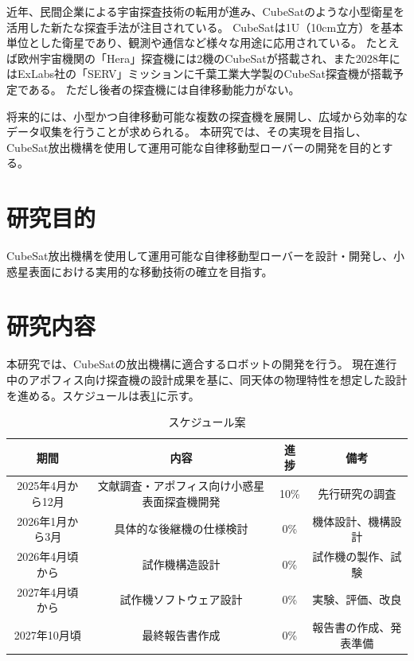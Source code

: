 \documentclass[dvipdfmx,titlepage,a4j]{jsarticle}
\begin{document}
近年、民間企業による宇宙探査技術の転用が進み、CubeSatのような小型衛星を活用した新たな探査手法が注目されている。
CubeSatは1U（10cm立方）を基本単位とした衛星であり、観測や通信など様々な用途に応用されている。
たとえば欧州宇宙機関の「Hera」探査機には2機のCubeSatが搭載され、また2028年にはExLabs社の「SERV」ミッションに千葉工業大学製のCubeSat探査機が搭載予定である。
ただし後者の探査機には自律移動能力がない。

将来的には、小型かつ自律移動可能な複数の探査機を展開し、広域から効率的なデータ収集を行うことが求められる。
本研究では、その実現を目指し、CubeSat放出機構を使用して運用可能な自律移動型ローバーの開発を目的とする。


\section{研究目的}
CubeSat放出機構を使用して運用可能な自律移動型ローバーを設計・開発し、小惑星表面における実用的な移動技術の確立を目指す。

\section{研究内容}
本研究では、CubeSatの放出機構に適合するロボットの開発を行う。
現在進行中のアポフィス向け探査機の設計成果を基に、同天体の物理特性を想定した設計を進める。スケジュールは表\ref{tab:schedule}に示す。

\begin{table}[H]
    \centering
    \caption{スケジュール案}
    \begin{tabular}{c|c|c|c}
        \hline
        期間           & 内容                     & 進捗   & 備考          \\
        \hline \hline
        2025年4月から12月 & 文献調査・アポフィス向け小惑星表面探査機開発 & 10\% & 先行研究の調査     \\
        \hline
        2026年1月から3月  & 具体的な後継機の仕様検討           & 0\%  & 機体設計、機構設計   \\
        \hline
        2026年4月頃から   & 試作機構造設計                & 0\%  & 試作機の製作、試験   \\
        \hline
        2027年4月頃から   & 試作機ソフトウェア設計            & 0\%  & 実験、評価、改良    \\
        \hline
        2027年10月頃    & 最終報告書作成                & 0\%  & 報告書の作成、発表準備 \\
        \hline
    \end{tabular}
    \label{tab:schedule}
\end{table}
\end{document}
